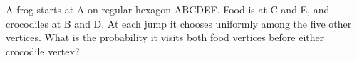 A frog starts at A on regular hexagon ABCDEF. Food is at C and E, and crocodiles at B and D. At each jump it chooses uniformly among the five other vertices. What is the probability it visits both food vertices before either crocodile vertex?

